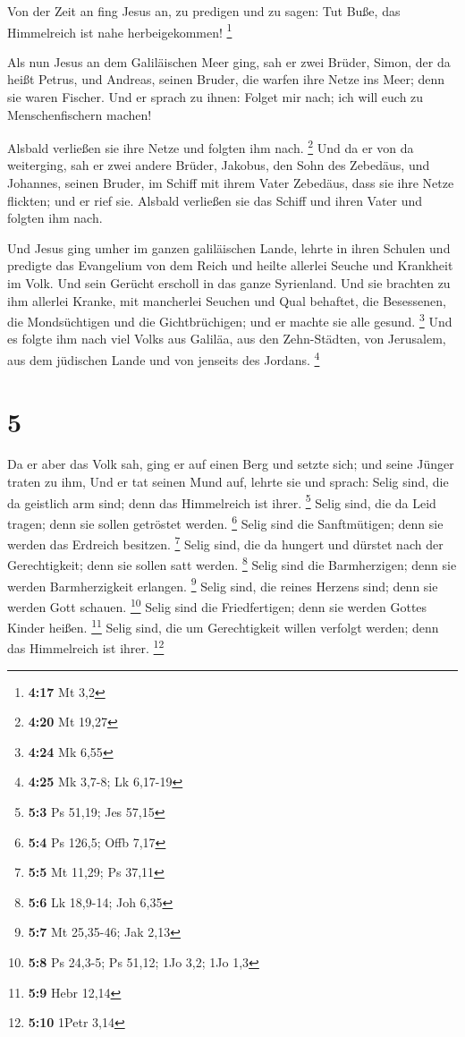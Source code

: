  Von der Zeit an fing Jesus an, zu predigen und zu sagen:
Tut Buße, das Himmelreich ist nahe herbeigekommen! \footnote{\textbf{4:17}
  Mt 3,2}

 Als nun Jesus an dem Galiläischen Meer ging, sah er zwei
Brüder, Simon, der da heißt Petrus, und Andreas, seinen Bruder, die
warfen ihre Netze ins Meer; denn sie waren Fischer.  Und er
sprach zu ihnen: Folget mir nach; ich will euch zu Menschenfischern
machen!

 Alsbald verließen sie ihre Netze und folgten ihm nach.
\footnote{\textbf{4:20} Mt 19,27}  Und da er von da
weiterging, sah er zwei andere Brüder, Jakobus, den Sohn des Zebedäus,
und Johannes, seinen Bruder, im Schiff mit ihrem Vater Zebedäus, dass
sie ihre Netze flickten; und er rief sie.  Alsbald
verließen sie das Schiff und ihren Vater und folgten ihm nach.

 Und Jesus ging umher im ganzen galiläischen Lande, lehrte
in ihren Schulen und predigte das Evangelium von dem Reich und heilte
allerlei Seuche und Krankheit im Volk.  Und sein Gerücht
erscholl in das ganze Syrienland. Und sie brachten zu ihm allerlei
Kranke, mit mancherlei Seuchen und Qual behaftet, die Besessenen, die
Mondsüchtigen und die Gichtbrüchigen; und er machte sie alle gesund.
\footnote{\textbf{4:24} Mk 6,55}  Und es folgte ihm nach
viel Volks aus Galiläa, aus den Zehn-Städten, von Jerusalem, aus dem
jüdischen Lande und von jenseits des Jordans. \footnote{\textbf{4:25} Mk
  3,7-8; Lk 6,17-19}

\hypertarget{section-3}{%
\section{5}\label{section-3}}

 Da er aber das Volk sah, ging er auf einen Berg und setzte
sich; und seine Jünger traten zu ihm,  Und er tat seinen
Mund auf, lehrte sie und sprach:  Selig sind, die da
geistlich arm sind; denn das Himmelreich ist ihrer. \footnote{\textbf{5:3}
  Ps 51,19; Jes 57,15}  Selig sind, die da Leid tragen; denn
sie sollen getröstet werden. \footnote{\textbf{5:4} Ps 126,5; Offb 7,17}
 Selig sind die Sanftmütigen; denn sie werden das Erdreich
besitzen. \footnote{\textbf{5:5} Mt 11,29; Ps 37,11}  Selig
sind, die da hungert und dürstet nach der Gerechtigkeit; denn sie sollen
satt werden. \footnote{\textbf{5:6} Lk 18,9-14; Joh 6,35} 
Selig sind die Barmherzigen; denn sie werden Barmherzigkeit erlangen.
\footnote{\textbf{5:7} Mt 25,35-46; Jak 2,13}  Selig sind,
die reines Herzens sind; denn sie werden Gott schauen. \footnote{\textbf{5:8}
  Ps 24,3-5; Ps 51,12; 1Jo 3,2; 1Jo 1,3}  Selig sind die
Friedfertigen; denn sie werden Gottes Kinder heißen. \footnote{\textbf{5:9}
  Hebr 12,14}  Selig sind, die um Gerechtigkeit willen
verfolgt werden; denn das Himmelreich ist ihrer. \footnote{\textbf{5:10}
  1Petr 3,14}

